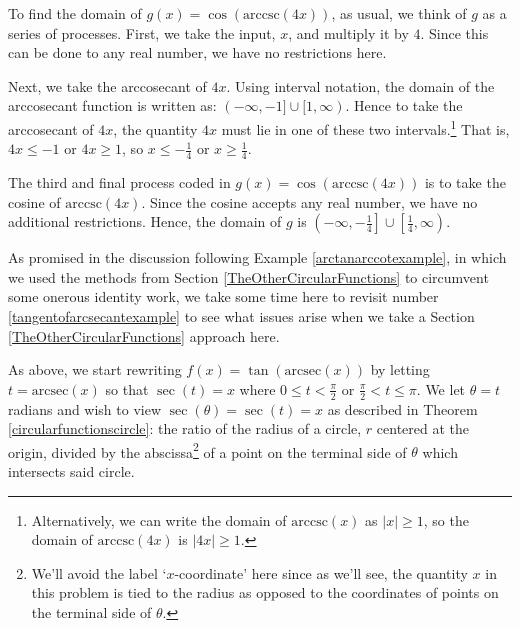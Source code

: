 \documentclass{ximera}
\begin{document}
\begin{example}
\begin{explanation}
\begin{enumerate}
\begin{enumerate}
 

To find the domain of $g(x) = \cos(\text{arccsc}(4x))$, as usual, we think of $g$ as a series of processes. First, we take the input, $x$, and multiply it by $4$.  Since this can be done to any real number, we have no restrictions here.

 

Next, we take the arccosecant of $4x$.  Using interval notation, the domain of the arccosecant function is written as: $(-\infty, -1] \cup [1, \infty)$.  Hence to take the arccosecant of $4x$, the quantity $4x$ must lie in one of these two intervals.\footnote{Alternatively, we can write the domain of $\text{arccsc}(x)$ as $|x| \geq 1$, so the domain of  $\text{arccsc}(4x)$ is $|4x| \geq 1$.}  That is, $4x \leq -1$ or $4x \geq 1$, so $x \leq -\frac{1}{4}$ or $x \geq \frac{1}{4}$.

 

The third and final process coded in $g(x) = \cos(\text{arccsc}(4x))$ is to take the cosine of $\text{arccsc}(4x)$. Since the cosine accepts any real number, we have no additional restrictions.  Hence, the domain of $g$ is $\left( -\infty, -\frac{1}{4} \right] \cup \left[ \frac{1}{4}, \infty \right)$.  

\end{enumerate}

\end{enumerate}
\end{explanation}
\end{example}


 

As promised in the discussion following Example  \ref{arctanarccotexample}, in which we used the methods from Section \ref{TheOtherCircularFunctions}  to circumvent some onerous identity work, we take some time here to revisit number \ref{tangentofarcsecantexample} to see what issues arise when we take a  Section \ref{TheOtherCircularFunctions} approach here.

 

As above, we start rewriting $f(x)  = \tan(\text{arcsec}(x))$ by letting $t = \text{arcsec}(x)$ so that $\sec(t) = x$ where  $0 \leq t < \frac{\pi}{2}$ or  $ \frac{\pi}{2} < t \leq \pi$.  We let $\theta = t$ radians and wish to view $\sec(\theta) = \sec(t) = x$ as described in Theorem \ref{circularfunctionscircle}: the ratio of the radius of a circle, $r$ centered at the origin,   divided by the abscissa\footnote{We'll avoid the label `$x$-coordinate' here since as we'll see, the quantity $x$ in this problem is tied to the radius as opposed to the coordinates of points on the terminal side of $\theta$.} of a point on the terminal side of $\theta$  which intersects said circle.
\end{document}
